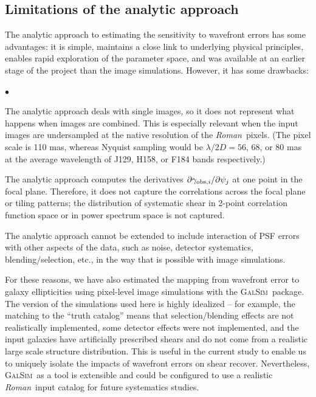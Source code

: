 \documentclass[usenatbib]{mnras}
\newcommand{\galsim}{\textsc{GalSim}}
\newcommand{\wfirst}{{\slshape Roman}}
\begin{document}
\subsection{Limitations of the analytic approach}

The analytic approach to estimating the sensitivity to wavefront errors has some advantages: it is simple, maintains a close link to underlying physical principles, enables rapid exploration of the parameter space, and was available at an earlier stage of the project than the image simulations. However, it has some drawbacks:
\begin{list}{$\bullet$}{}
\item The analytic approach deals with single images, so it does not represent what happens when images are combined. This is especially relevant when the input images are undersampled at the native resolution of the \wfirst\ pixels. (The pixel scale is 110 mas, whereas Nyquist sampling would be $\lambda/2D = 56$, 68, or 80 mas at the average wavelength of J129, H158, or F184 bands respectively.)
\item The analytic approach computes the derivatives $\partial\gamma_{{\rm obs},i}/\partial\psi_j$ at one point in the focal plane. Therefore, it does not capture the correlations across the focal plane or tiling patterns; the distribution of systematic shear in 2-point correlation function space or in power spectrum space is not captured.
\item The analytic approach cannot be extended to include interaction of PSF errors with other aspects of the data, such as noise, detector systematics, blending/selection, etc., in the way that is possible with image simulations.
\end{list}
For these reasons, we have also estimated the mapping from wavefront error to galaxy ellipticities using pixel-level image simulations with the \galsim\ package. The version of the simulations used here is highly idealized -- for example, the matching to the ``truth catalog'' means that selection/blending effects are not realistically implemented, some detector effects were not implemented, and the input galaxies have artificially prescribed shears and do not come from a realistic large scale structure distribution. This is useful in the current study to enable us to uniquely isolate the impacts of wavefront errors on shear recover. Nevertheless, \galsim\ as a tool is extensible and could be configured to use a realistic \wfirst\ input catalog for future systematics studies.
\end{document}
